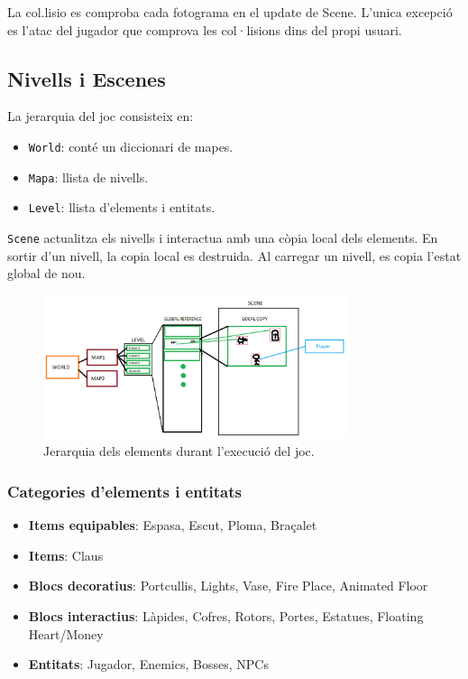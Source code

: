 \documentclass[a4paper,12pt]{article}
\begin{document}
La col.lisio es comproba cada fotograma en el update de Scene. L'unica excepció es l'atac del jugador que comprova les col·lisions dins del propi usuari.

\subsection{Nivells i Escenes}
La jerarquia del joc consisteix en:
\begin{itemize}
    \item \texttt{World}: conté un diccionari de mapes.
    \item \texttt{Mapa}: llista de nivells.
    \item \texttt{Level}: llista d'elements i entitats.
\end{itemize}
\texttt{Scene} actualitza els nivells i interactua amb una còpia local dels elements. En sortir d'un nivell, la copia local es destruida. Al carregar un nivell, es copia l'estat global de nou.

\begin{figure}[ht!]
    \centering
    \includegraphics[width=0.8\textwidth]{../imgs/global_to_local.png}
    \caption{Jerarquia dels elements durant l'execució del joc.}
    \label{fig:global_to_local}
\end{figure}

\subsubsection{Categories d'elements i entitats}
\begin{itemize}
    \item \textbf{Items equipables}: Espasa, Escut, Ploma, Braçalet
    \item \textbf{Items}: Claus
    \item \textbf{Blocs decoratius}: Portcullis, Lights, Vase, Fire Place, Animated Floor
    \item \textbf{Blocs interactius}: Làpides, Cofres, Rotors, Portes, Estatues, Floating Heart/Money
    \item \textbf{Entitats}: Jugador, Enemics, Bosses, NPCs
\end{itemize}
\end{document}
